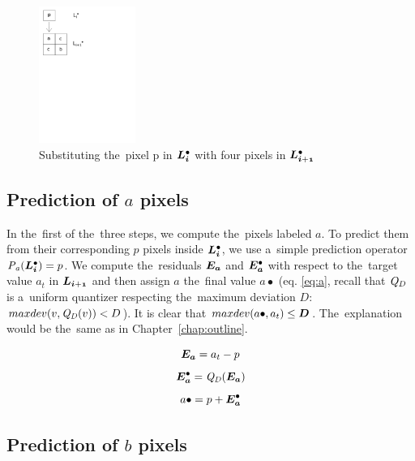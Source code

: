 \begin{figure}
	\includegraphics[trim={0 19cm 11cm 0}, clip, width=0.28\textwidth]{figures/subst.pdf}\centering
	\caption{Substituting the~pixel p in $\ldot{i}$ with four pixels in $\ldot{i+1}$}
	\label{fig:subst}
\end{figure}

\subsection*{Prediction of $a$ pixels}

In the~first of the~three steps, we compute the~pixels labeled $a$. To predict them from their corresponding $p$ pixels inside $\ldot{i}$, we use a~simple prediction operator $\opnorm{P}{a}(\ldot{i}) = p$. We compute the~residuals $\objnorm{E}{a}$ and $\objdot{E}{a}$ with respect to the~target value $a_t$ in $\lnorm{i+1}$ and then assign $a$ the~final value $a\bullet$ (eq. \ref{eq:a}, recall that $\mathit{Q_{D}}$ is a~uniform quantizer respecting the~maximum deviation $D$: $maxdev(v, \mathit{Q_{D}}(v)) < D$). It is clear that  $maxdev(a\bullet, a_{t}) \leq \objnorm{D}{}$. The~explanation would be the~same as in Chapter~\ref{chap:outline}.

$$\objnorm{E}{a} = a_t - p$$
$$\objdot{E}{a} = \opnorm{Q}{D}(\objnorm{E}{a})$$
\begin{equation}
\label{eq:a}
a\bullet = p + \objdot{E}{a}
\end{equation}

\subsection*{Prediction of $b$ pixels}

